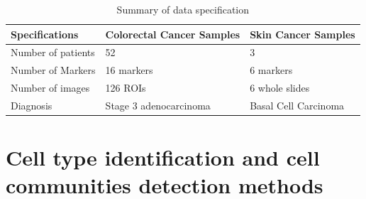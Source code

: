 \begin{table}[ht]
\centering
\caption{Summary of data specification}
\begin{tabular}{||P{7cm} || P{3cm} || P{3cm} ||} 
 \hline
 Specifications & Colorectal Cancer Samples & Skin Cancer Samples   \\ [0.33ex] 
 \hline\hline
 Number of patients & 52 & 3   \\ 
 \hline
 Number of Markers & 16 markers & 6 markers  \\ 
 \hline
 Number of images & 126 ROIs &  6 whole slides \\
 \hline
 Diagnosis & Stage 3 adenocarcinoma & Basal Cell Carcinoma  \\ [1ex] 
 \hline
\end{tabular}
\label{table:DataInfor}
\end{table}


\section{Cell type identification and cell communities detection methods}
\label{Sec:3.2_CCC_ST}	%
